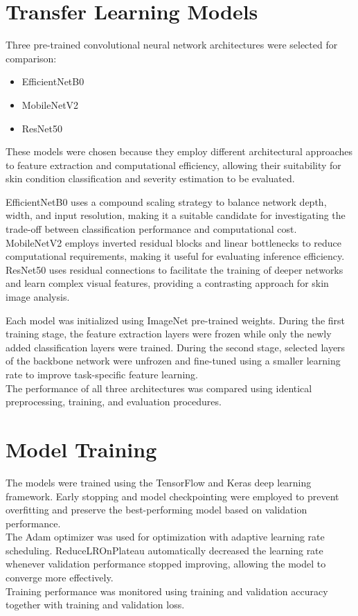 \section{Transfer Learning Models}
Three pre-trained convolutional neural network architectures were selected for comparison:
\begin{itemize}
    \item EfficientNetB0
    \item MobileNetV2
    \item ResNet50
\end{itemize}

These models were chosen because they employ different architectural approaches to feature extraction and computational efficiency, allowing their suitability for skin condition classification and severity estimation to be evaluated.

EfficientNetB0 uses a compound scaling strategy to balance network depth, width, and input resolution, making it a suitable candidate for investigating the trade-off between classification performance and computational cost. MobileNetV2 employs inverted residual blocks and linear bottlenecks to reduce computational requirements, making it useful for evaluating inference efficiency. ResNet50 uses residual connections to facilitate the training of deeper networks and learn complex visual features, providing a contrasting approach for skin image analysis.

Each model was initialized using ImageNet pre-trained weights. During the first training stage, the feature extraction layers were frozen while only the newly added classification layers were trained. During the second stage, selected layers of the backbone network were unfrozen and fine-tuned using a smaller learning rate to improve task-specific feature learning.\\
The performance of all three architectures was compared using identical preprocessing, training, and evaluation procedures.

\section{Model Training}
The models were trained using the TensorFlow and Keras deep learning framework. Early stopping and model checkpointing were employed to prevent overfitting and preserve the best-performing model based on validation performance.\\
The Adam optimizer was used for optimization with adaptive learning rate scheduling. ReduceLROnPlateau automatically decreased the learning rate whenever validation performance stopped improving, allowing the model to converge more effectively.\\
Training performance was monitored using training and validation accuracy together with training and validation loss.


